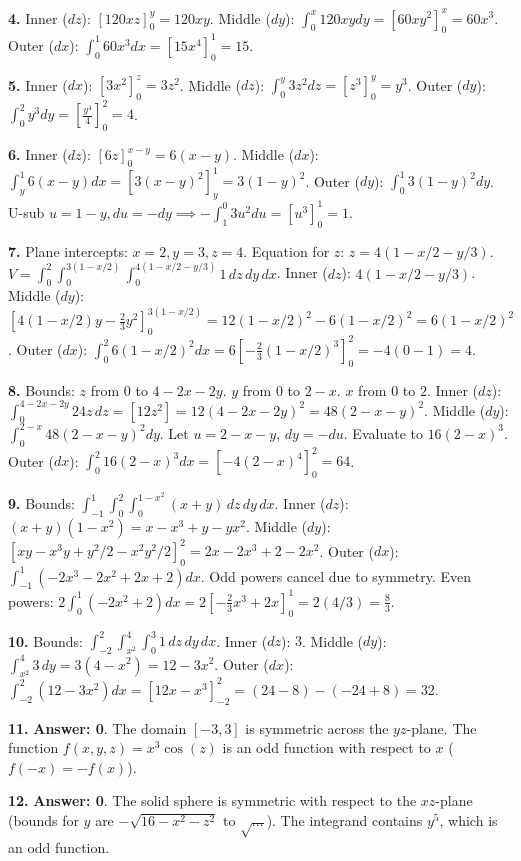 \documentclass[11pt]{article}
\begin{document}
\textbf{4.} Inner ($dz$): $[120xz]_0^y = 120xy$. Middle ($dy$): $\int_0^x 120xy dy = [60xy^2]_0^x = 60x^3$. Outer ($dx$): $\int_0^1 60x^3 dx = [15x^4]_0^1 = 15$.

\textbf{5.} Inner ($dx$): $[3x^2]_0^z = 3z^2$. Middle ($dz$): $\int_0^y 3z^2 dz = [z^3]_0^y = y^3$. Outer ($dy$): $\int_0^2 y^3 dy = [\frac{y^4}{4}]_0^2 = 4$.

\textbf{6.} Inner ($dz$): $[6z]_0^{x-y} = 6(x-y)$. Middle ($dx$): $\int_y^1 6(x-y) dx = [3(x-y)^2]_y^1 = 3(1-y)^2$. Outer ($dy$): $\int_0^1 3(1-y)^2 dy$. U-sub $u=1-y, du=-dy \implies -\int_1^0 3u^2 du = [u^3]_0^1 = 1$.

\textbf{7.} Plane intercepts: $x=2, y=3, z=4$. Equation for $z$: $z = 4(1 - x/2 - y/3)$. $V = \int_0^2 \int_0^{3(1-x/2)} \int_0^{4(1-x/2-y/3)} 1 \,dz\,dy\,dx$.
Inner ($dz$): $4(1-x/2-y/3)$.
Middle ($dy$): $[4(1-x/2)y - \frac{2}{3}y^2]_0^{3(1-x/2)} = 12(1-x/2)^2 - 6(1-x/2)^2 = 6(1-x/2)^2$.
Outer ($dx$): $\int_0^2 6(1-x/2)^2 dx = 6[-\frac{2}{3}(1-x/2)^3]_0^2 = -4(0 - 1) = 4$.

\textbf{8.} Bounds: $z$ from $0$ to $4-2x-2y$. $y$ from $0$ to $2-x$. $x$ from $0$ to $2$.
Inner ($dz$): $\int_0^{4-2x-2y} 24z \,dz = [12z^2] = 12(4-2x-2y)^2 = 48(2-x-y)^2$.
Middle ($dy$): $\int_0^{2-x} 48(2-x-y)^2 dy$. Let $u=2-x-y$, $dy=-du$. Evaluate to $16(2-x)^3$.
Outer ($dx$): $\int_0^2 16(2-x)^3 dx = [-4(2-x)^4]_0^2 = 64$.

\textbf{9.} Bounds: $\int_{-1}^1 \int_0^2 \int_0^{1-x^2} (x+y) \,dz\,dy\,dx$.
Inner ($dz$): $(x+y)(1-x^2) = x-x^3+y-yx^2$.
Middle ($dy$): $[xy - x^3y + y^2/2 - x^2y^2/2]_0^2 = 2x - 2x^3 + 2 - 2x^2$.
Outer ($dx$): $\int_{-1}^1 (-2x^3 - 2x^2 + 2x + 2) dx$. Odd powers cancel due to symmetry. Even powers: $2 \int_0^1 (-2x^2 + 2) dx = 2[-\frac{2}{3}x^3 + 2x]_0^1 = 2(4/3) = \frac{8}{3}$.

\textbf{10.} Bounds: $\int_{-2}^2 \int_{x^2}^4 \int_0^3 1 \,dz\,dy\,dx$.
Inner ($dz$): $3$. Middle ($dy$): $\int_{x^2}^4 3 \,dy = 3(4-x^2) = 12-3x^2$.
Outer ($dx$): $\int_{-2}^2 (12-3x^2) dx = [12x - x^3]_{-2}^2 = (24-8) - (-24+8) = 32$.

\textbf{11.} \textbf{Answer: 0}. The domain $[-3,3]$ is symmetric across the $yz$-plane. The function $f(x,y,z) = x^3 \cos(z)$ is an odd function with respect to $x$ ($f(-x) = -f(x)$).

\textbf{12.} \textbf{Answer: 0}. The solid sphere is symmetric with respect to the $xz$-plane (bounds for $y$ are $-\sqrt{16-x^2-z^2}$ to $\sqrt{...}$). The integrand contains $y^5$, which is an odd function.
\end{document}
